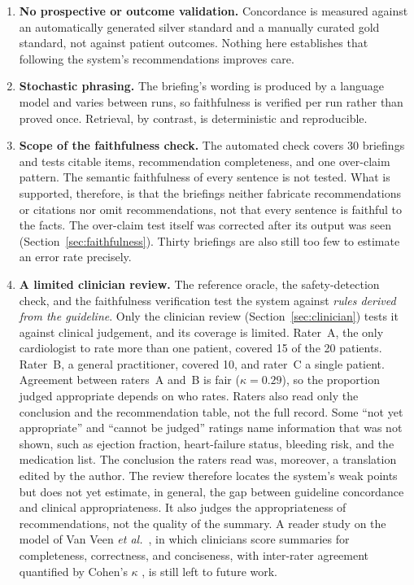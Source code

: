 \begin{enumerate}
    to a conservative subset and would, in a deployment, cause those patients to receive no
    output at all. Widening the gate to a disjunction of concepts is a small change to the
    query and is the first item of future work.
    \item \textbf{No prospective or outcome validation.} Concordance is measured against an
    automatically generated silver standard and a manually curated gold standard, not
    against patient outcomes. Nothing here establishes that following the system's
    recommendations improves care.
    \item \textbf{Stochastic phrasing.} The briefing's wording is produced by a language
    model and varies between runs, so faithfulness is verified per run rather than proved
    once. Retrieval, by contrast, is deterministic and reproducible.
    \item \textbf{Scope of the faithfulness check.} The automated check covers 30 briefings
    and tests citable items, recommendation completeness, and one over-claim pattern. The
    semantic faithfulness of every sentence is not tested. What is supported, therefore, is
    that the briefings neither fabricate recommendations or citations nor omit
    recommendations, not that every sentence is faithful to the facts. The over-claim test
    itself was corrected after its output was seen (Section~\ref{sec:faithfulness}). Thirty
    briefings are also still too few to estimate an error rate precisely.
    \item \textbf{A limited clinician review.} The reference oracle, the safety-detection
    check, and the faithfulness verification test the system against \emph{rules derived
    from the guideline}. Only the clinician review (Section~\ref{sec:clinician}) tests it
    against clinical judgement, and its coverage is limited. Rater~A, the only cardiologist
    to rate more than one patient, covered 15 of the 20 patients. Rater~B, a general
    practitioner, covered 10, and rater~C a single patient. Agreement between raters~A and~B
    is fair ($\kappa = 0.29$), so the proportion judged appropriate depends on who rates.
    Raters also read only the conclusion and the recommendation table, not the full record.
    Some ``not yet appropriate'' and ``cannot be judged'' ratings name information that was
    not shown, such as ejection fraction, heart-failure status, bleeding risk, and the
    medication list. The conclusion the raters read was, moreover, a translation edited by
    the author. The review therefore locates the system's weak points but does not yet
    estimate, in general, the gap between guideline concordance and clinical
    appropriateness. It also judges the appropriateness of recommendations, not the quality
    of the summary. A reader study on the model of Van Veen \textit{et al.}~\cite{vanveen2023},
    in which clinicians score summaries for completeness, correctness, and conciseness, with
    inter-rater agreement quantified by Cohen's $\kappa$ \cite{cohen1960}, is still left to
    future work.
\end{enumerate}
